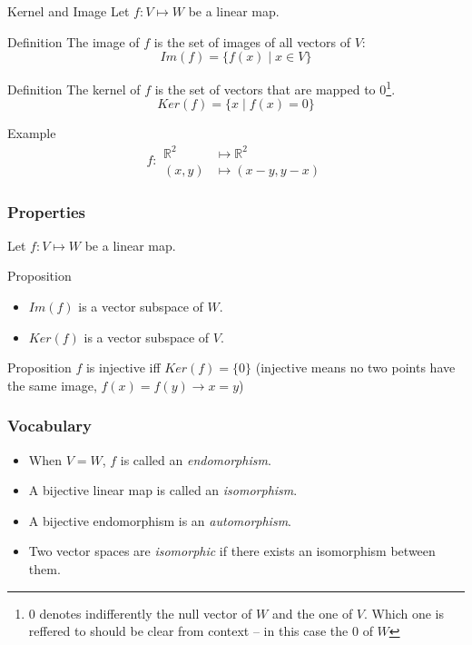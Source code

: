 \documentclass{beamer}
\begin{document}
\begin{frame}{Kernel and Image}
  Let $f: V \mapsto W$ be a linear map.

  \begin{block}{Definition}
    The image of $f$ is the set of images of all vectors of $V$:
    \[Im(f) = \{ f(x) \mid x \in V \} \]
  \end{block}

  \begin{block}{Definition}
    The kernel of $f$ is the set of vectors that are mapped to $0$\footnote{$0$ denotes indifferently the null vector of $W$ and the one of $V$. Which one is reffered to should be clear from context -- in this case the $0$ of $W$}.
    \[Ker(f) = \{ x \mid f(x) = 0\}\]
  \end{block}
\end{frame}

\begin{frame}
\begin{exampleblock}{Example}
  \[f: \begin{aligned} \mathbb{R}^2 &\mapsto \mathbb{R}^2\\ (x,y) &\mapsto (x - y, y - x) \end{aligned}\]

  \begin{center}
    
  \end{center}
  
\end{exampleblock}

\end{frame}

\begin{frame}
  \frametitle{Properties}
  Let $f: V \mapsto W$ be a linear map. 
  \begin{block}{Proposition}
    \begin{itemize}
    \item $Im(f)$ is a vector subspace of $W$.
    \item $Ker(f)$ is a vector subspace of $V$. 
    \end{itemize}
  \end{block}

  \begin{block}{Proposition}
    $f$ is injective iff $Ker(f) = \{0\}$ (injective means no two points have the same image, $f(x) = f(y) \rightarrow x = y$)
  \end{block}
\end{frame}


\begin{frame}
  \frametitle{Vocabulary}
  \begin{itemize}
  \item When $V = W$, $f$ is called an \emph{endomorphism}.
  \item A bijective linear map is called an \emph{isomorphism}.
  \item A bijective endomorphism is an \emph{automorphism}.
  \item Two vector spaces are \emph{isomorphic} if there exists an isomorphism between them.
  \end{itemize}
\end{frame}
\end{document}
